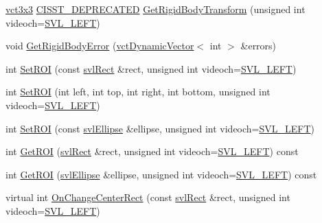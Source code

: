 \begin{DoxyCompactItemize}
\item 
\hyperlink{vct_fixed_size_matrix_types_8h_aac4a419dacf9282410675d42ebc86a7c}{vct3x3} \hyperlink{cmn_portability_8h_a63da7164735f9501be651b1f2bbc0121}{C\+I\+S\+S\+T\+\_\+\+D\+E\+P\+R\+E\+C\+A\+T\+E\+D} \hyperlink{classsvl_filter_image_tracker_a514560e58532ada9df7e5fb5ce4ccd5c}{Get\+Rigid\+Body\+Transform} (unsigned int videoch=\hyperlink{svl_definitions_8h_ab9fec7615f19c8df2919eebcab0b187f}{S\+V\+L\+\_\+\+L\+E\+F\+T})
\item 
void \hyperlink{classsvl_filter_image_tracker_a6861cd92affa6c1d507f11bf955eb60d}{Get\+Rigid\+Body\+Error} (\hyperlink{classvct_dynamic_vector}{vct\+Dynamic\+Vector}$<$ int $>$ \&errors)
\item 
int \hyperlink{classsvl_filter_image_tracker_a846f66ab216401cbe51dd7d74e30cf63}{Set\+R\+O\+I} (const \hyperlink{structsvl_rect}{svl\+Rect} \&rect, unsigned int videoch=\hyperlink{svl_definitions_8h_ab9fec7615f19c8df2919eebcab0b187f}{S\+V\+L\+\_\+\+L\+E\+F\+T})
\item 
int \hyperlink{classsvl_filter_image_tracker_aa190c53f01cfa940a53aacfa3baa1dc3}{Set\+R\+O\+I} (int left, int top, int right, int bottom, unsigned int videoch=\hyperlink{svl_definitions_8h_ab9fec7615f19c8df2919eebcab0b187f}{S\+V\+L\+\_\+\+L\+E\+F\+T})
\item 
int \hyperlink{classsvl_filter_image_tracker_a0e15c1e808d158bf5549aca8dfe394dc}{Set\+R\+O\+I} (const \hyperlink{structsvl_ellipse}{svl\+Ellipse} \&ellipse, unsigned int videoch=\hyperlink{svl_definitions_8h_ab9fec7615f19c8df2919eebcab0b187f}{S\+V\+L\+\_\+\+L\+E\+F\+T})
\item 
int \hyperlink{classsvl_filter_image_tracker_ab255a660860a32ba48e15ccf86524be4}{Get\+R\+O\+I} (\hyperlink{structsvl_rect}{svl\+Rect} \&rect, unsigned int videoch=\hyperlink{svl_definitions_8h_ab9fec7615f19c8df2919eebcab0b187f}{S\+V\+L\+\_\+\+L\+E\+F\+T}) const 
\item 
int \hyperlink{classsvl_filter_image_tracker_ad882be9b3eed81397c5946d4dbb42730}{Get\+R\+O\+I} (\hyperlink{structsvl_ellipse}{svl\+Ellipse} \&ellipse, unsigned int videoch=\hyperlink{svl_definitions_8h_ab9fec7615f19c8df2919eebcab0b187f}{S\+V\+L\+\_\+\+L\+E\+F\+T}) const 
\item 
virtual int \hyperlink{classsvl_filter_image_tracker_a4a62f05474d8fc1d769e1dd58b592c17}{On\+Change\+Center\+Rect} (const \hyperlink{structsvl_rect}{svl\+Rect} \&rect, unsigned int videoch=\hyperlink{svl_definitions_8h_ab9fec7615f19c8df2919eebcab0b187f}{S\+V\+L\+\_\+\+L\+E\+F\+T})
\item 

\end{DoxyCompactItemize}
